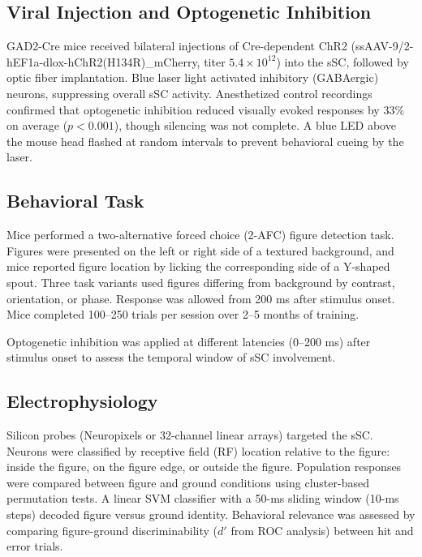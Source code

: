\documentclass[12pt]{article}
\begin{document}
\subsection{Viral Injection and Optogenetic Inhibition}

GAD2-Cre mice received bilateral injections of Cre-dependent ChR2 (ssAAV-9/2-hEF1a-dlox-hChR2(H134R)\_mCherry, titer $5.4 \times 10^{12}$) into the sSC, followed by optic fiber implantation. Blue laser light activated inhibitory (GABAergic) neurons, suppressing overall sSC activity. Anesthetized control recordings confirmed that optogenetic inhibition reduced visually evoked responses by 33\% on average ($p < 0.001$), though silencing was not complete. A blue LED above the mouse head flashed at random intervals to prevent behavioral cueing by the laser.

\subsection{Behavioral Task}

Mice performed a two-alternative forced choice (2-AFC) figure detection task. Figures were presented on the left or right side of a textured background, and mice reported figure location by licking the corresponding side of a Y-shaped spout. Three task variants used figures differing from background by contrast, orientation, or phase. Response was allowed from 200 ms after stimulus onset. Mice completed 100--250 trials per session over 2--5 months of training.

Optogenetic inhibition was applied at different latencies (0--200 ms) after stimulus onset to assess the temporal window of sSC involvement.

\subsection{Electrophysiology}

Silicon probes (Neuropixels or 32-channel linear arrays) targeted the sSC. Neurons were classified by receptive field (RF) location relative to the figure: inside the figure, on the figure edge, or outside the figure. Population responses were compared between figure and ground conditions using cluster-based permutation tests. A linear SVM classifier with a 50-ms sliding window (10-ms steps) decoded figure versus ground identity. Behavioral relevance was assessed by comparing figure-ground discriminability ($d'$ from ROC analysis) between hit and error trials.
\end{document}

